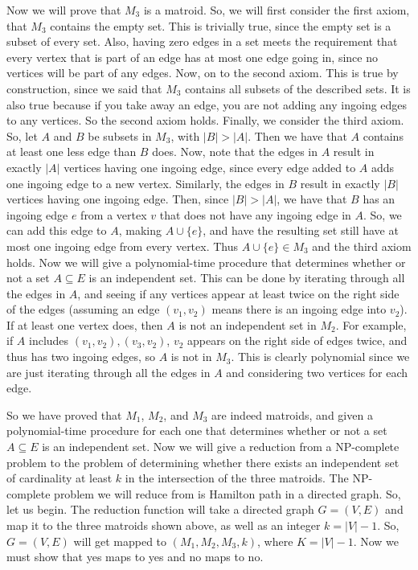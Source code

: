 \documentclass{article}
\begin{document}
Now we will prove that $M_3$ is a matroid. So,
we will first consider the first axiom, that $M_3$ contains the empty set. This
is trivially true, since the empty set is a subset of every set. Also, having
zero edges in a set meets the requirement that every vertex that is part of an
edge has at most one edge going in, since no vertices will be part of any edges.
Now, on to the second axiom. This is true by construction, since we said that
$M_3$ contains all subsets of the described sets. It is also true because if you
take away an edge, you are not adding any ingoing edges to any vertices. So the
second axiom holds. Finally, we consider the third axiom. So, let $A$ and $B$ be
subsets in $M_3$, with $|B| > |A|$. Then we have that $A$ contains at least one
less edge than $B$ does. Now, note that the edges in $A$ result in exactly $|A|$
vertices having one ingoing edge, since every edge added to $A$ adds one
ingoing edge to a new vertex. Similarly, the edges in $B$ result in exactly
$|B|$ vertices having one ingoing edge. Then, since $|B| > |A|$, we have that
$B$ has an ingoing edge $e$ from a vertex $v$ that does not have any ingoing edge
in $A$. So, we can add this edge to $A$, making $A \cup \{e\}$, and have the
resulting set still have at most one ingoing edge from every vertex. Thus $A
\cup \{e\} \in M_3$ and the third axiom holds. Now we will give a
polynomial-time procedure that determines whether or not a set $A \subseteq E$ is an
independent set. This can be done by iterating through all the edges in $A$, and
seeing if any vertices appear at least twice on the right side of the
edges (assuming an edge $(v_1,
v_2)$ means there is an ingoing edge into $v_2$). If at least one
vertex does, then $A$ is not an independent set in $M_2$. For example, if $A$
includes $(v_1, v_2), (v_3, v_2)$, $v_2$ appears on the right side of edges
twice, and thus has two ingoing edges, so $A$ is not in $M_3$. This is clearly
polynomial since we are just iterating through all the edges in $A$ and
considering two vertices for each edge.

So we have proved that $M_1$, $M_2$, and $M_3$ are indeed matroids, and given a
polynomial-time procedure for each one that determines whether or not a set
$A \subseteq E$ is an independent set. Now we will
give a reduction from a NP-complete problem to the problem of determining
whether there exists an independent set of cardinality at least $k$ in the
intersection of the three matroids. The NP-complete problem we will reduce from
is Hamilton path in a directed graph. So, let us begin. The reduction function
will take a directed graph $G = (V,E)$ and map it to the three matroids shown
above, as well as an integer $k = |V| - 1$. So, $G = (V,E)$ will get mapped to
$(M_1, M_2, M_3, k)$, where $K = |V| - 1$. Now we must show that yes maps to yes
and no maps to no.
\end{document}
